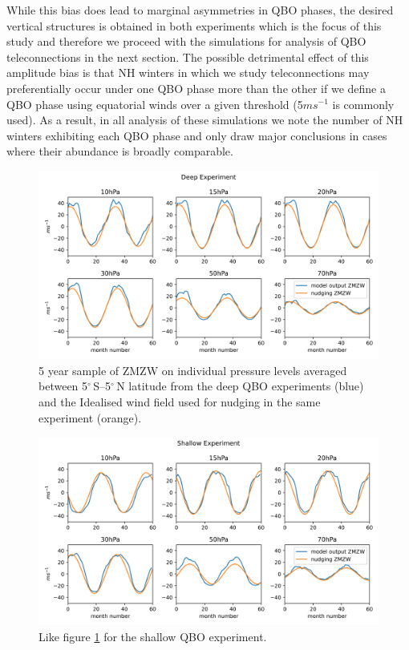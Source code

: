 While this bias does lead to marginal asymmetries in QBO phases, the desired vertical structures is obtained in both experiments which is the focus of this study and therefore we proceed with the simulations for analysis of QBO teleconnections in the next section. The possible detrimental effect of this amplitude bias is that NH winters in which we study teleconnections may preferentially occur under one QBO phase more than the other if we define a QBO phase using equatorial winds over a given threshold (5$ms^{-1}$ is commonly used). As a result, in all analysis of these simulations we note the number of NH winters exhibiting each QBO phase and only draw major conclusions in cases where their abundance is broadly comparable. 

\begin{figure}[h!]
\begin{center}
\noindent\includegraphics[width = 0.95\linewidth]{Figures/Figures-deepQBO/winds_on_lev_nudging_deep.png}
\caption[Equatorial ZMZW time-height profiles from QBO nudging experiments]{5 year sample of ZMZW on individual pressure levels averaged between 5$^{\circ}$\,S--5$^{\circ}$\,N latitude from the deep QBO experiments (blue) and the Idealised wind field used for nudging in the same experiment (orange).}
\label{fig:winds_on_levs_deep}
\end{center}
\end{figure}

\begin{figure}[h!]
\begin{center}
\noindent\includegraphics[width = 0.95\linewidth]{Figures/Figures-deepQBO/winds_on_lev_nudging_shallow.png}
\caption[Equatorial ZMZW time-height profiles from QBO nudging experiments]{Like figure \ref{fig:winds_on_levs_deep} for the shallow QBO experiment.}
\label{fig:winds_on_levs_shallow}
\end{center}
\end{figure}
\newpage

